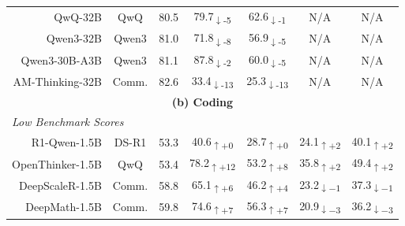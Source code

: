 \documentclass{article} %
\begin{document}
\begin{table}[t]
\begin{tabular}{r|c|c|cc|cc}
    QwQ-32B                 & QwQ & 80.5 & \cellcolor{red!15}79.7\textsubscript{$\downarrow$-5} & \cellcolor{red!11}62.6\textsubscript{$\downarrow$-1} & N/A & N/A \\

    Qwen3-32B               & Qwen3 & 81.0 & \cellcolor{red!28}71.8\textsubscript{$\downarrow$-8} & \cellcolor{red!15}56.9\textsubscript{$\downarrow$-5} & N/A & N/A \\

    Qwen3-30B-A3B           & Qwen3 & 81.1 & \cellcolor{red!12}87.8\textsubscript{$\downarrow$-2} & \cellcolor{red!15}60.0\textsubscript{$\downarrow$-5} & N/A & N/A \\

    AM-Thinking-32B      & Comm. & 82.6 & \cellcolor{red!33}33.4\textsubscript{$\downarrow$-13} & \cellcolor{red!33}25.3\textsubscript{$\downarrow$-13} & N/A & N/A \\
    \midrule\midrule
    \multicolumn{7}{c}{\textbf{(b) Coding}} \\
    \midrule
    \multicolumn{7}{l}{\textit{Low Benchmark Scores}} \\
    \midrule

    R1-Qwen-1.5B      & DS-R1 & 53.3 &
    \cellcolor{green!0}40.6\textsubscript{$\uparrow+0$} &
    \cellcolor{green!0}28.7\textsubscript{$\uparrow+0$} &
    \cellcolor{green!20}24.1\textsubscript{$\uparrow+2$} &
    \cellcolor{green!20}40.1\textsubscript{$\uparrow+2$} \\

    OpenThinker-1.5B  & QwQ   & 53.4 &
    \cellcolor{green!40}78.2\textsubscript{$\uparrow+12$} &
    \cellcolor{green!40}53.2\textsubscript{$\uparrow+8$} &
    \cellcolor{green!20}35.8\textsubscript{$\uparrow+2$} &
    \cellcolor{green!20}49.4\textsubscript{$\uparrow+2$} \\

    DeepScaleR-1.5B   & Comm. & 58.8 &
    \cellcolor{green!40}65.1\textsubscript{$\uparrow+6$} &
    \cellcolor{green!30}46.2\textsubscript{$\uparrow+4$} &
    \cellcolor{red!15}23.2\textsubscript{$\downarrow-1$} &
    \cellcolor{red!15}37.3\textsubscript{$\downarrow-1$} \\

    DeepMath-1.5B     & Comm. & 59.8 &
    \cellcolor{green!40}74.6\textsubscript{$\uparrow+7$} &
    \cellcolor{green!40}56.3\textsubscript{$\uparrow+7$} &
    \cellcolor{red!25}20.9\textsubscript{$\downarrow-3$} &
    \cellcolor{red!25}36.2\textsubscript{$\downarrow-3$} \\


\end{tabular}
\end{table}
\end{document}

